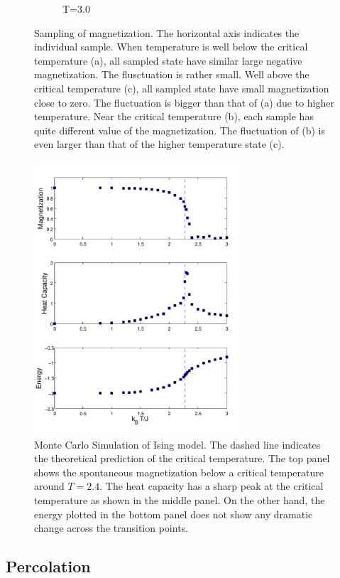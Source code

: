 \begin{figure}
\begin{subfigure}{0.32\textwidth}
		\caption{T=3.0}
	\end{subfigure}
\caption{Sampling of magnetization.  The horizontal axis indicates the individual sample.  When temperature is well below the critical temperature (a), all sampled state have similar large negative magnetization.  The flusctuation is rather small.  Well above the critical temperature (c), all sampled state have small magnetization close to zero.  The fluctuation is bigger than that of (a) due to higher temperature.  Near the critical temperature (b), each sample has quite different value of the magnetization.  The fluctuation of (b) is even larger than that of the higher temperature state (c). }\label{fig:ising_M_sample}
\end{figure}


\begin{figure}
\centering
\includegraphics[width=3in]{17.Metropolis/ising_stat.pdf}
\caption{Monte Carlo Simulation of Ising model. The dashed line indicates the theoretical prediction of the critical temperature.
The top panel shows the spontaneous magnetization below a critical temperature around $T=2.4$.  The heat capacity has a sharp peak at the critical temperature as shown in the middle panel. On the other hand, the energy plotted in the bottom panel does not show any dramatic change across the transition points.}
\label{fig:ising_transition}
\end{figure}

\subsection{Percolation}

